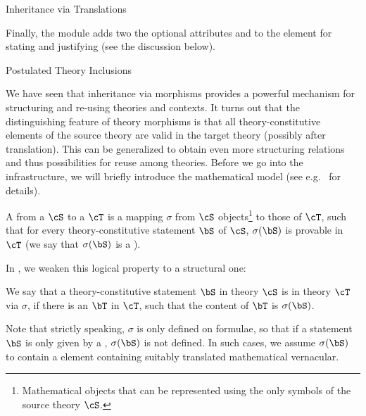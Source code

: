\begin{omgroup}[id=complex-theories,short=Complex Theories,
                            creators=miko,contributors=frabe]
\begin{omgroup}[id=morphisms]{Inheritance via Translations}
\begin{module}[id=morphisms]
Finally, the {} module adds two the optional attributes
 and  to
the  element for stating and justifying {}
(see the discussion below).
\end{module}
\end{omgroup}

\begin{omgroup}[id=theory-inclusions]{Postulated Theory Inclusions}
\begin{module}[id=theory-morphisms]

We have seen that inheritance via morphisms provides a powerful mechanism for structuring
and re-using theories and contexts. It turns out that the distinguishing feature of theory
morphisms is that all theory-constitutive elements of the source theory are valid in the
target theory (possibly after translation). This can be generalized to obtain even more
structuring relations and thus possibilities for reuse among theories. Before we go into
the \omdoc infrastructure, we will briefly introduce the mathematical model (see
e.g.~\cite{Hutter:mocsv00} for details).

\begin{definition}[display=flow,id=theory-inclusion.def]
  A  from a  $\cS$ to a
   $\cT$ is a mapping $\sigma$ from $\cS$
  objects\footnote{Mathematical objects that can be represented using the only symbols of
    the source theory $\cS$.} to those of $\cT$, such that for every theory-constitutive
  statement $\bS$ of $\cS$, $\sigma(\bS)$ is provable in $\cT$ (we say that $\sigma(\bS)$
  is a ).
\end{definition}   

In \omdoc, we weaken this logical property to a structural one: 
\begin{definition}[id=structurally-included.def,display=flow]
  We say that a theory-constitutive statement $\bS$ in theory $\cS$ is
   in theory $\cT$ via $\sigma$, if there is an
   $\bT$ in $\cT$, such that the content of $\bT$ is
  $\sigma(\bS)$.
\end{definition}
Note that strictly speaking, $\sigma$ is only defined on formulae, so that if a statement
$\bS$ is only given by a , $\sigma(\bS)$ is not defined. In such cases, we
assume $\sigma(\bS)$ to contain a  element containing suitably translated
mathematical vernacular.


\end{module}
\end{omgroup}
\end{omgroup}
